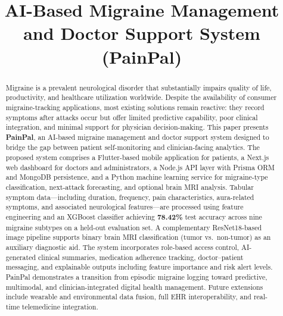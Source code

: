 \documentclass[conference,twocolumn,letterpaper]{IEEEtran}
\begin{document}
\title{AI-Based Migraine Management and Doctor Support System (PainPal)}

\author{
\and
{}
}

\maketitle

\begin{abstract}
Migraine is a prevalent neurological disorder that substantially impairs quality of life, productivity, and healthcare utilization worldwide. Despite the availability of consumer migraine-tracking applications, most existing solutions remain reactive: they record symptoms after attacks occur but offer limited predictive capability, poor clinical integration, and minimal support for physician decision-making. This paper presents \textbf{PainPal}, an AI-based migraine management and doctor support system designed to bridge the gap between patient self-monitoring and clinician-facing analytics. The proposed system comprises a Flutter-based mobile application for patients, a Next.js web dashboard for doctors and administrators, a Node.js API layer with Prisma ORM and MongoDB persistence, and a Python machine learning service for migraine-type classification, next-attack forecasting, and optional brain MRI analysis. Tabular symptom data---including duration, frequency, pain characteristics, aura-related symptoms, and associated neurological features---are processed using feature engineering and an XGBoost classifier achieving \textbf{78.42\%} test accuracy across nine migraine subtypes on a held-out evaluation set. A complementary ResNet18-based image pipeline supports binary brain MRI classification (tumor vs.\ non-tumor) as an auxiliary diagnostic aid. The system incorporates role-based access control, AI-generated clinical summaries, medication adherence tracking, doctor--patient messaging, and explainable outputs including feature importance and risk alert levels. PainPal demonstrates a transition from episodic migraine logging toward predictive, multimodal, and clinician-integrated digital health management. Future extensions include wearable and environmental data fusion, full EHR interoperability, and real-time telemedicine integration.
\end{abstract}
\end{document}
